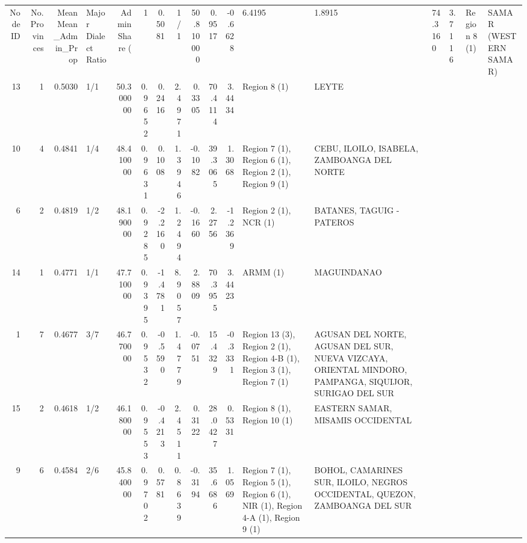 \begin{tabular}{rrrlrrrrrrrll}
\toprule
Node ID & No. Provinces & Mean Mean_Admin_Prop & Major Dialect Ratio & Admin Share (%
 & 1 & {} \color[HTML]{F1F1F1} 0.5081 & 1/1 & {} \color[HTML]{F1F1F1} 50.810000 & 0.9517 & -0.6628 & 6.4195 & 1.8915 & 74.3160 & 3.7116 & Region 8 (1) & SAMAR (WESTERN SAMAR) \\
13 & 1 & {} \color[HTML]{F1F1F1} 0.5030 & 1/1 & {} \color[HTML]{F1F1F1} 50.300000 & 0.9652 & 0.2416 & 2.4971 & 0.3305 & 70.4114 & 3.4434 & Region 8 (1) & LEYTE \\
10 & 4 & {} \color[HTML]{F1F1F1} 0.4841 & 1/4 & {} \color[HTML]{F1F1F1} 48.410000 & 0.9631 & 0.1008 & 1.3946 & -0.1082 & 39.3065 & 1.3068 & Region 7 (1), Region 6 (1), Region 2 (1), Region 9 (1) & CEBU, ILOILO, ISABELA, ZAMBOANGA DEL NORTE \\
6 & 2 & {} \color[HTML]{F1F1F1} 0.4819 & 1/2 & {} \color[HTML]{F1F1F1} 48.190000 & 0.9285 & -2.2160 & 1.2494 & -0.1660 & 2.2756 & -1.2369 & Region 2 (1), NCR (1) & BATANES, TAGUIG - PATEROS \\
14 & 1 & {} \color[HTML]{F1F1F1} 0.4771 & 1/1 & {} \color[HTML]{F1F1F1} 47.710000 & 0.9395 & -1.4781 & 8.9057 & 2.8809 & 70.3955 & 3.4423 & ARMM (1) & MAGUINDANAO \\
1 & 7 & {} \color[HTML]{F1F1F1} 0.4677 & 3/7 & {} \color[HTML]{F1F1F1} 46.770000 & 0.9532 & -0.5590 & 1.4779 & -0.0751 & 15.4329 & -0.3331 & Region 13 (3), Region 2 (1), Region 4-B (1), Region 3 (1), Region 7 (1) & AGUSAN DEL NORTE, AGUSAN DEL SUR, NUEVA VIZCAYA, ORIENTAL MINDORO, PAMPANGA, SIQUIJOR, SURIGAO DEL SUR \\
15 & 2 & {} \color[HTML]{F1F1F1} 0.4618 & 1/2 & {} \color[HTML]{F1F1F1} 46.180000 & 0.9553 & -0.4213 & 2.4511 & 0.3122 & 28.0427 & 0.5331 & Region 8 (1), Region 10 (1) & EASTERN SAMAR, MISAMIS OCCIDENTAL \\
9 & 6 & {} \color[HTML]{000000} 0.4584 & 2/6 & {} \color[HTML]{000000} 45.840000 & 0.9702 & 0.5781 & 0.8639 & -0.3194 & 35.6686 & 1.0569 & Region 7 (1), Region 5 (1), Region 6 (1), NIR (1), Region 4-A (1), Region 9 (1) & BOHOL, CAMARINES SUR, ILOILO, NEGROS OCCIDENTAL, QUEZON, ZAMBOANGA DEL SUR \\

\end{tabular}
